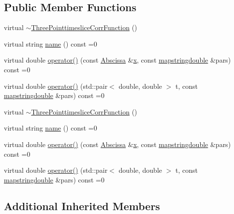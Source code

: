 \subsection*{Public Member Functions}
\begin{DoxyCompactItemize}
\item 
virtual \mbox{\hyperlink{classThreePointtimesliceCorrFunction_adf56423311ccc5edd1ea822fe762a9b7}{$\sim$\+Three\+Pointtimeslice\+Corr\+Function}} ()
\item 
virtual string \mbox{\hyperlink{classThreePointtimesliceCorrFunction_ad364af81f908825603c7810afdb7cb2d}{name}} () const =0
\item 
virtual double \mbox{\hyperlink{classThreePointtimesliceCorrFunction_af4198f5c0d9085c5dcc8d79447d54348}{operator()}} (const \mbox{\hyperlink{classAbscissa}{Abscissa}} \&\mbox{\hyperlink{old__edb_8cc_a63584b830e7aaacb521b11b72291a4bc}{x}}, const \mbox{\hyperlink{lib_2fitting__lib_2includes_8h_a647b481c557c7966517f753340a81d13}{mapstringdouble}} \&pars) const =0
\item 
virtual double \mbox{\hyperlink{classThreePointtimesliceCorrFunction_a9d86382fdb47e87d53aea1878abd1da0}{operator()}} (std\+::pair$<$ double, double $>$ t, const \mbox{\hyperlink{lib_2fitting__lib_2includes_8h_a647b481c557c7966517f753340a81d13}{mapstringdouble}} \&pars) const =0
\item 
virtual \mbox{\hyperlink{classThreePointtimesliceCorrFunction_adf56423311ccc5edd1ea822fe762a9b7}{$\sim$\+Three\+Pointtimeslice\+Corr\+Function}} ()
\item 
virtual string \mbox{\hyperlink{classThreePointtimesliceCorrFunction_ad364af81f908825603c7810afdb7cb2d}{name}} () const =0
\item 
virtual double \mbox{\hyperlink{classThreePointtimesliceCorrFunction_af4198f5c0d9085c5dcc8d79447d54348}{operator()}} (const \mbox{\hyperlink{classAbscissa}{Abscissa}} \&\mbox{\hyperlink{old__edb_8cc_a63584b830e7aaacb521b11b72291a4bc}{x}}, const \mbox{\hyperlink{lib_2fitting__lib_2includes_8h_a647b481c557c7966517f753340a81d13}{mapstringdouble}} \&pars) const =0
\item 
virtual double \mbox{\hyperlink{classThreePointtimesliceCorrFunction_a9d86382fdb47e87d53aea1878abd1da0}{operator()}} (std\+::pair$<$ double, double $>$ t, const \mbox{\hyperlink{lib_2fitting__lib_2includes_8h_a647b481c557c7966517f753340a81d13}{mapstringdouble}} \&pars) const =0
\end{DoxyCompactItemize}
\subsection*{Additional Inherited Members}


